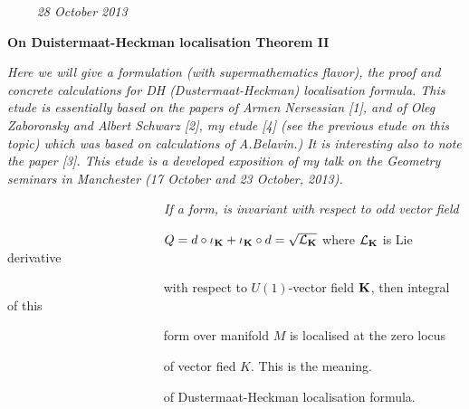 
\def\vare {\varepsilon}
\def\A {{\bf A}}
\def\FF {{\bf F}}
\def\a {\alpha}
\def\K {{\bf K}}
\def\s {{\sigma}}
\def\p{\partial}
\def\vare{{\varepsilon}}
\def\L {{\cal L}}
\def\G {{\Gamma}}
\def\C {{\bf C}}
\def\Z {{\bf Z}}
\def\U  {{\cal U}}
\def\R  {{\bf R}}
\def\E  {{\bf E}}
\def\l {\lambda}
\def\degree {{\bf {\rm degree}\,\,}}
\def \finish {${\,\,\vrule height1mm depth2mm width 8pt}$}
\def \m {\medskip}
\def\r {{\bf r}}
\def\v {{\bf v}}
\def\n {{\bf n}}
\def\b {{\bf b}}
\def\ss  {{\bf s }}
\def\e{{\bf e}}
\def\ac {{\bf a}}
\def \X   {{\bf X}}
\def \Y   {{\bf Y}}
\def \x   {{\bf x}}
\def \y   {{\bf y}}
\def\w {{\omega}} 
\def\wv {{\buildrel \rightarrow\over \omega}}

\def\K{{\bf K}}
\def\locus {\hbox{locus of $\K$}}


$\qquad$ {\sl 28 October 2013}

\bigskip

\centerline {\bf On Duistermaat-Heckman localisation Theorem II}

\m

{\it
   Here we will give a formulation (with supermathematics flavor),
the proof and concrete calculations
for DH (Dustermaat-Heckman) localisation formula. This etude is essentially
based on the papers of Armen Nersessian [1], and
of  Oleg Zaboronsky and Albert Schwarz [2], my etude
[4] (see the previous etude on this topic) which was based on calculations 
of A.Belavin.) It is interesting also to note the paper [3].
This etude is a  developed exposition of my talk
on the Geometry seminars in Manchester
(17 October and 23 October, 2013).}


\m
      \medskip
{\sl
  $\qquad\qquad$$\qquad\qquad$$\qquad\qquad$ If a form, 
  is invariant with respect to odd vector field


$\qquad\qquad$$\qquad\qquad$$\qquad\qquad$  
  $Q=d\circ \iota_\K+\iota_\K\circ d=\sqrt {\L_\K}$ 
   where $\L_\K$ is Lie derivative 

$\qquad\qquad$$\qquad\qquad$$\qquad\qquad$ with respect
 to $U(1)$-vector field $\K$, then integral of this 

$\qquad\qquad$$\qquad\qquad$$\qquad\qquad$ form over manifold
  $M$ is localised at the zero locus 

$\qquad\qquad$$\qquad\qquad$$\qquad\qquad$ of vector fied $K$. This is the
 meaning.

$\qquad\qquad$$\qquad\qquad$$\qquad\qquad$ 
of Dustermaat-Heckman localisation formula.

}
 $$ $$


